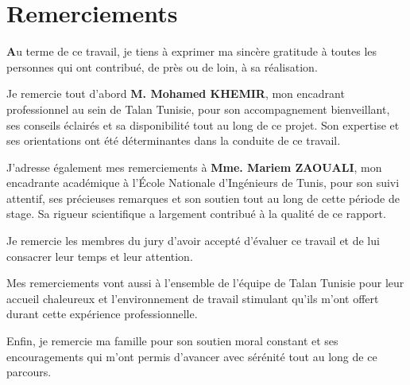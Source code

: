 \section*{Remerciements}

\vspace{0.8cm}

\noindent\textbf{A}u terme de ce travail, je tiens à exprimer ma sincère gratitude à toutes les personnes qui ont contribué, de près ou de loin, à sa réalisation.

\medskip

Je remercie tout d'abord \textbf{M. Mohamed KHEMIR}, mon encadrant professionnel au sein de Talan Tunisie, pour son accompagnement bienveillant, ses conseils éclairés et sa disponibilité tout au long de ce projet. Son expertise et ses orientations ont été déterminantes dans la conduite de ce travail.

\medskip

J'adresse également mes remerciements à \textbf{Mme. Mariem ZAOUALI}, mon encadrante académique à l'École Nationale d'Ingénieurs de Tunis, pour son suivi attentif, ses précieuses remarques et son soutien tout au long de cette période de stage. Sa rigueur scientifique a largement contribué à la qualité de ce rapport.

\medskip

Je remercie les membres du jury d'avoir accepté d'évaluer ce travail et de lui consacrer leur temps et leur attention.

\medskip

Mes remerciements vont aussi à l'ensemble de l'équipe de Talan Tunisie pour leur accueil chaleureux et l'environnement de travail stimulant qu'ils m'ont offert durant cette expérience professionnelle.

\medskip

Enfin, je remercie ma famille pour son soutien moral constant et ses encouragements qui m'ont permis d'avancer avec sérénité tout au long de ce parcours.
